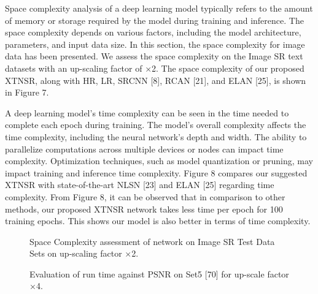 \documentclass[twocolumn]{svjour3}          %
\begin{document}
Space complexity analysis of a deep learning model typically refers to the amount of memory or storage required by the model during training and inference. The space complexity depends on various factors, including the model architecture, parameters, and input data size. In this section, the space complexity for image data has been presented. We assess the space complexity on the Image SR text datasets with an up-scaling factor of ×2. The space complexity of our proposed XTNSR, along with HR, LR, SRCNN [8], RCAN [21], and ELAN [25], is shown in Figure 7. 

A deep learning model's time complexity can be seen in the time needed to complete each epoch during training. The model's overall complexity affects the time complexity, including the neural network's depth and width. The ability to parallelize computations across multiple devices or nodes can impact time complexity. Optimization techniques, such as model quantization or pruning, may impact training and inference time complexity. Figure 8 compares our suggested XTNSR with state-of-the-art NLSN [23] and ELAN [25] regarding time complexity. From Figure 8, it can be observed that in comparison to other methods, our proposed XTNSR network takes less time per epoch for 100 training epochs. This shows our model is also better in terms of time complexity.

\begin{figure}
  \centering
   \caption {Space Complexity assessment of network on Image SR Test Data Sets on up-scaling factor  ×2.}
    \label{fig:10}
\end{figure}

\begin{figure}
  \centering
   \caption {Evaluation of run time against PSNR on Set5 [70] for up-scale factor ×4.}
    \label{fig:11}
\end{figure}
\end{document}
